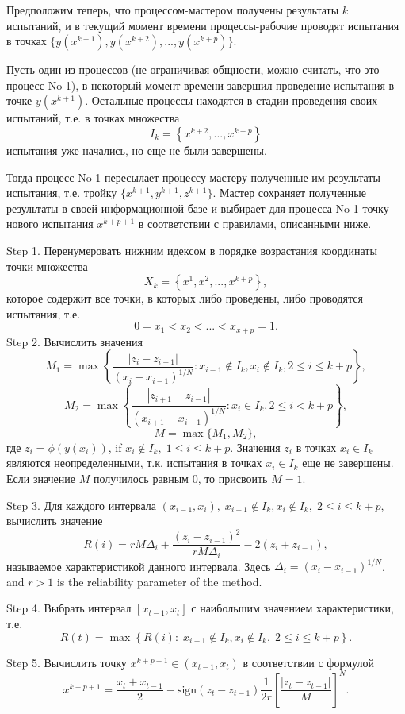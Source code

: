\documentclass[mathematics,article,submit,pdftex,moreauthors]{Definitions/mdpi}
\begin{document}
Предположим теперь, что процессом-мастером получены результаты $k$ испытаний, и в текущий момент времени процессы-рабочие проводят испытания в точках $\{y(x^{k+1}), y(x^{k+2}), ...,y(x^{k+p})\}$. 

Пусть один из процессов (не ограничивая общности, можно считать, что это процесс No 1), в некоторый момент времени завершил проведение испытания в точке $y(x^{k+1})$.
Остальные процессы находятся в стадии проведения своих испытаний, т.е. в точках множества 
\[
I_k = \left\{ x^{k+2},...,x^{k+p} \right\}
\]
испытания уже начались, но еще не были завершены.

Тогда процесс No 1 пересылает процессу-мастеру полученные им результаты испытания, т.е. тройку  $\{x^{k+1},y^{k+1},z^{k+1}\}$.
Мастер сохраняет полученные результаты в своей информационной базе и выбирает для процесса No 1 точку нового испытания $x^{k+p+1}$ в соответствии с правилами, описанными ниже.

Step 1. Перенумеровать нижним идексом в порядке возрастания координаты точки множества
\[
X_k = \left\{x^1, x^2,...,x^{k+p} \right\},
\]
которое содержит все точки, в которых либо проведены, либо проводятся испытания, т.е.
\[
0=x_1<x_2<...<x_{x+p}=1.
\]
Step 2. Вычислить значения 
\[
M_1=\max \left\{ \frac{ \left|z_i - z_{i-1} \right|}{(x_i-x_{i-1})^{1/N}} : x_{i-1} \notin I_k, x_i \notin I_k, 2\leq i\leq k+p \right\},
\]
\[
M_2=\max \left\{ \frac{ \left|z_{i+1} - z_{i-1} \right|}{(x_{i+1}-x_{i-1})^{1/N}} : x_i \in I_k, 2\leq i < k+p \right\},
\]
\[
M=\max\{M_1,M_2\},
\]
где $z_i=\phi(y(x_i))$, if $x_i \notin I_k, \; 1\leq i \leq k+p$. Значения $z_i$ в точках $x_i \in I_k$ являются неопределенными, т.к. испытания в точках $x_i \in I_k$ еще не завершены. Если значение $M$ получилось равным 0, то присвоить $M=1$.

Step 3. Для каждого интервала $(x_{i-1},x_i), \; x_{i-1} \notin I_k, x_i \notin I_k, \; 2\leq i\leq k+p$, вычислить значение 
\[
R(i)=rM\Delta_i+\frac{(z_i-z_{i-1})^2}{rM\Delta_i}-2(z_i+z_{i-1}),
\]
называемое характеристикой данного интервала. Здесь $\Delta_i=\left(x_i-x_{i-1}\right)^{1/N}$, and $r>1$ is the reliability parameter of the method.

Step 4. Выбрать интервал $[x_{t-1},x_t]$ с наибольшим значением характеристики, т.е.
\[
R(t) = \max \left\{ R(i): \; x_{i-1} \notin I_k, x_i \notin I_k, \; 2\leq i\leq k+p \right\}.
\]

Step 5. Вычислить точку $x^{k+p+1} \in (x_{t-1},x_t)$ в соответствии с формулой
\[
x^{k+p+1} = \frac{x_{t}+x_{t-1}}{2} - \mathrm{sign}(z_{t}-z_{t-1})\frac{1}{2r}\left[\frac{\left|z_{t}-z_{t-1}\right|}{M}\right]^N.
\]
\end{document}

